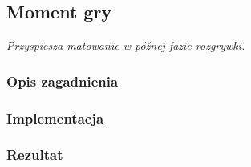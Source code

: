 \subsection{Moment gry}
\label{subsec:moment-gry}

\textit{Przyspiesza matowanie w późnej fazie rozgrywki.}


\subsubsection{Opis zagadnienia}
\subsubsection{Implementacja}
\subsubsection{Rezultat}